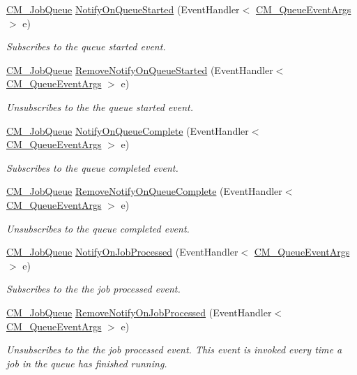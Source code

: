 \begin{DoxyCompactItemize}
\hyperlink{class_c_m___job_queue}{C\+M\+\_\+\+Job\+Queue} \hyperlink{class_c_m___job_queue_a2918eb628f865860a22032eafa3618b5}{Notify\+On\+Queue\+Started} (Event\+Handler$<$ \hyperlink{class_c_m___queue_event_args}{C\+M\+\_\+\+Queue\+Event\+Args} $>$ e)
\begin{DoxyCompactList}\small\item\em Subscribes to the queue started event. \end{DoxyCompactList}\item 
\hyperlink{class_c_m___job_queue}{C\+M\+\_\+\+Job\+Queue} \hyperlink{class_c_m___job_queue_a772043be6d95571dffe266eefb99a99f}{Remove\+Notify\+On\+Queue\+Started} (Event\+Handler$<$ \hyperlink{class_c_m___queue_event_args}{C\+M\+\_\+\+Queue\+Event\+Args} $>$ e)
\begin{DoxyCompactList}\small\item\em Unsubscribes to the the queue started event. \end{DoxyCompactList}\item 
\hyperlink{class_c_m___job_queue}{C\+M\+\_\+\+Job\+Queue} \hyperlink{class_c_m___job_queue_af9aec1172b9818353bae58cb013b445d}{Notify\+On\+Queue\+Complete} (Event\+Handler$<$ \hyperlink{class_c_m___queue_event_args}{C\+M\+\_\+\+Queue\+Event\+Args} $>$ e)
\begin{DoxyCompactList}\small\item\em Subscribes to the queue completed event. \end{DoxyCompactList}\item 
\hyperlink{class_c_m___job_queue}{C\+M\+\_\+\+Job\+Queue} \hyperlink{class_c_m___job_queue_a77456f4bd081c75ba385f96e1d72077a}{Remove\+Notify\+On\+Queue\+Complete} (Event\+Handler$<$ \hyperlink{class_c_m___queue_event_args}{C\+M\+\_\+\+Queue\+Event\+Args} $>$ e)
\begin{DoxyCompactList}\small\item\em Unsubscribes to the queue completed event. \end{DoxyCompactList}\item 
\hyperlink{class_c_m___job_queue}{C\+M\+\_\+\+Job\+Queue} \hyperlink{class_c_m___job_queue_a6e17336d22c1588d5836d1053749467e}{Notify\+On\+Job\+Processed} (Event\+Handler$<$ \hyperlink{class_c_m___queue_event_args}{C\+M\+\_\+\+Queue\+Event\+Args} $>$ e)
\begin{DoxyCompactList}\small\item\em Subscribes to the the job processed event. \end{DoxyCompactList}\item 
\hyperlink{class_c_m___job_queue}{C\+M\+\_\+\+Job\+Queue} \hyperlink{class_c_m___job_queue_aa947d55c737bee485b24a621a3780046}{Remove\+Notify\+On\+Job\+Processed} (Event\+Handler$<$ \hyperlink{class_c_m___queue_event_args}{C\+M\+\_\+\+Queue\+Event\+Args} $>$ e)
\begin{DoxyCompactList}\small\item\em Unsubscribes to the the job processed event. This event is invoked every time a job in the queue has finished running. \end{DoxyCompactList}\end{DoxyCompactItemize}
